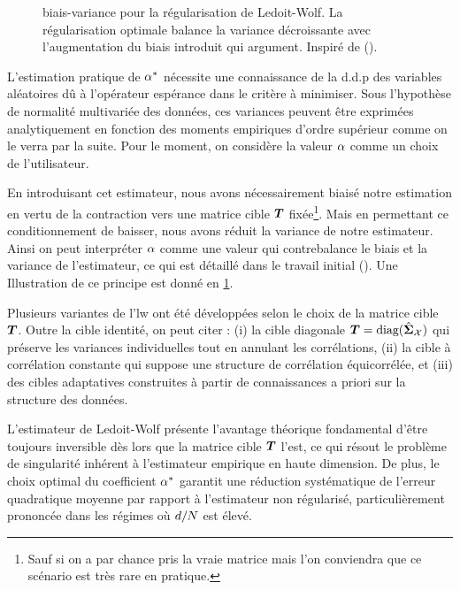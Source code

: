 \begin{figure}
  
  \caption{biais-variance pour la régularisation de Ledoit-Wolf. La régularisation optimale balance la variance décroissante avec l'augmentation du biais introduit qui argument. Inspiré de (\cite{LedoitWolf2004}).}
  \label{fig:context-estimation-lwfbiasvar}

\end{figure}


L'estimation pratique de $\alpha^*$ nécessite une connaissance de la d.d.p des variables aléatoires dû à l'opérateur espérance dans le critère à minimiser. Sous l'hypothèse de normalité multivariée des données, ces variances peuvent être exprimées analytiquement en fonction des moments empiriques d'ordre supérieur comme on le verra par la suite. Pour le moment, on considère la valeur $\alpha$ comme un choix de l'utilisateur.

En introduisant cet estimateur, nous avons nécessairement biaisé notre estimation en vertu de la contraction vers une matrice cible $\boldsymbol{T}$ fixée\footnote{Sauf si on a par chance pris la vraie matrice mais l'on conviendra que ce scénario est très rare en pratique.}. Mais en permettant ce conditionnement de baisser, nous avons réduit la variance de notre estimateur. Ainsi on peut interpréter $\alpha$ comme une valeur qui contrebalance le biais et la variance de l'estimateur, ce qui est détaillé dans le travail initial (\cite{LedoitWolf2004}). Une Illustration de ce principe est donné en \cref{fig:context-estimation-lwfbiasvar}.




\begin{remark}
Plusieurs variantes de l'lw ont été développées selon le choix de la matrice cible $\boldsymbol{T}$. Outre la cible identité, on peut citer : (i) la cible diagonale $\boldsymbol{T} = \text{diag}(\hat{\boldsymbol{\Sigma}}_{\mathcal{X}})$ qui préserve les variances individuelles tout en annulant les corrélations, (ii) la cible à corrélation constante qui suppose une structure de corrélation équicorrélée, et (iii) des cibles adaptatives construites à partir de connaissances a priori sur la structure des données.
\end{remark}


L'estimateur de Ledoit-Wolf présente l'avantage théorique fondamental d'être toujours inversible dès lors que la matrice cible $\boldsymbol{T}$ l'est, ce qui résout le problème de singularité inhérent à l'estimateur empirique en haute dimension. De plus, le choix optimal du coefficient $\alpha^*$ garantit une réduction systématique de l'erreur quadratique moyenne par rapport à l'estimateur non régularisé, particulièrement prononcée dans les régimes où $d/N$ est élevé.

